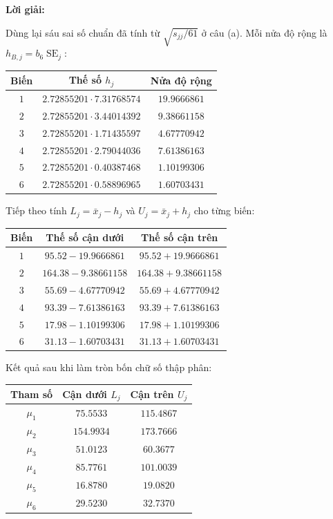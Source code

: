 \documentclass[11pt,a4paper]{article}
\newenvironment{solution}{%
  \par\medskip\noindent\textbf{Lời giải:}\par\nobreak\smallskip\noindent\ignorespaces
}{\par}
\begin{document}
\begin{solution}
\begin{enumerate}[label=\textbf{\alph*)}]
Dùng lại sáu sai số chuẩn đã tính từ $\sqrt{s_{jj}/61}$ ở câu (a).
Mỗi nửa độ rộng là $h_{B,j}=b_6\operatorname{SE}_j$:
\begin{center}
\small
\begin{tabular}{ccc}
\toprule
Biến & Thế số $h_j$ & Nửa độ rộng\\
\midrule
$1$ & $2.72855201\cdot7.31768574$ & $19.9666861$\\
$2$ & $2.72855201\cdot3.44014392$ & $9.38661158$\\
$3$ & $2.72855201\cdot1.71435597$ & $4.67770942$\\
$4$ & $2.72855201\cdot2.79044036$ & $7.61386163$\\
$5$ & $2.72855201\cdot0.40387468$ & $1.10199306$\\
$6$ & $2.72855201\cdot0.58896965$ & $1.60703431$\\
\bottomrule
\end{tabular}
\end{center}
Tiếp theo tính $L_j=\bar{x}_j-h_j$ và $U_j=\bar{x}_j+h_j$ cho từng biến:
\begin{center}
\small
\setlength{\tabcolsep}{4pt}
\begin{tabular}{ccc}
\toprule
Biến & Thế số cận dưới & Thế số cận trên\\
\midrule
$1$ & $95.52-19.9666861$ & $95.52+19.9666861$\\
$2$ & $164.38-9.38661158$ & $164.38+9.38661158$\\
$3$ & $55.69-4.67770942$ & $55.69+4.67770942$\\
$4$ & $93.39-7.61386163$ & $93.39+7.61386163$\\
$5$ & $17.98-1.10199306$ & $17.98+1.10199306$\\
$6$ & $31.13-1.60703431$ & $31.13+1.60703431$\\
\bottomrule
\end{tabular}
\end{center}
\begin{samepage}
Kết quả sau khi làm tròn bốn chữ số thập phân:
\begin{center}
\begin{tabular}{ccc}
\toprule
Tham số & Cận dưới $L_j$ & Cận trên $U_j$\\
\midrule
$\mu_1$ & $75.5533$ & $115.4867$\\
$\mu_2$ & $154.9934$ & $173.7666$\\
$\mu_3$ & $51.0123$ & $60.3677$\\
$\mu_4$ & $85.7761$ & $101.0039$\\
$\mu_5$ & $16.8780$ & $19.0820$\\
$\mu_6$ & $29.5230$ & $32.7370$\\
\bottomrule
\end{tabular}
\end{center}
\end{samepage}


\end{enumerate}
\end{solution}
\end{document}
